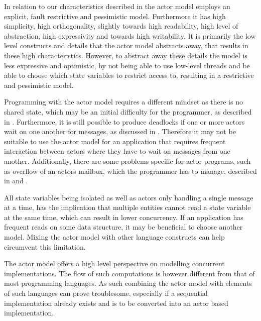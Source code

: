 In relation to our characteristics described in  the actor model employs an explicit, fault restrictive and pessimistic model. Furthermore it has high simplicity, high orthogonality, slightly towards high readability, high level of abstraction, high expressivity and towards high writability. It is primarily the low level constructs and details that the actor model abstracts away, that results in these high characteristics. However, to abstract away these details the model is less expressive and optimistic, by not being able to use low-level threads and be able to choose which state variables to restrict access to, resulting in a restrictive and pessimistic model.

Programming with the actor model requires a different mindset as there is no shared state, which may be an initial difficulty for the programmer, as described in . Furthermore, it is still possible to produce deadlocks if one or more actors wait on one another for messages, as discussed in . Therefore it may not be suitable to use the actor model for an application that requires frequent interaction between actors where they have to wait on messages from one another. Additionally, there are some problems specific for actor programs, such as overflow of an actors mailbox, which the programmer has to manage, described in  and . 

All state variables being isolated as well as actors only handling a single message at a time, has the implication that multiple entities cannot read a state variable at the same time, which can result in lower concurrency. If an application has frequent reads on some data structure, it may be beneficial to choose another model. Mixing the actor model with other language constructs can help circumvent this limitation.%

The actor model offers a high level perspective on modelling concurrent implementations. The flow of such computations is however different from that of most programming languages. As such combining the actor model with elements of such languages can prove troublesome, especially if a sequential implementation already exists and is to be converted into an actor based implementation.

